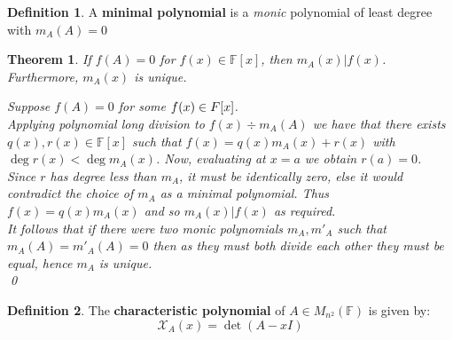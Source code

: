 \documentclass[11pt, a4paper]{report}
\makeatletter
\numberwithin{equation}{section}
\renewcommand{\chi}{\mathcal{X}}
\newcommand{\F}{\mathbb{F}}
\numberwithin{equation}{subsection}
\theoremstyle{plain}
\newtheorem{thm}{Theorem}[chapter] %
\theoremstyle{definition}
\newtheorem{defn}{Definition}[chapter]
\theoremstyle{remark}
\newtheorem*{prf}{Proof}
\renewenvironment{prf}[1][\proofname]{\par
  \vspace{-\topsep}%
  \normalfont
  \topsep0pt \partopsep0pt %
  \trivlist
  \item[\hskip\labelsep
        \itshape
    #1\@addpunct{.}]\ignorespaces
}{%
  \popQED\endtrivlist\@endpefalse
  \addvspace{6pt plus 6pt} %
}
\newcommand{\pr}[1]{\begin{adjustwidth}{1cm}{} \begin{prf} #1 \end{prf} \end{adjustwidth}}
\makeatother
\begin{document}
\newpage
\begin{defn} A \textbf{minimal polynomial} is a \textit{monic} polynomial of least degree with $m_A(A) = 0$ \end{defn}

\begin{thm}
If $f(A) = 0$ for $f(x) \in \F[x]$, then $m_A(x) | f(x)$. Furthermore, $m_A(x)$ is unique.
\pr{
Suppose $f(A) = 0$ for some $f(x) \in \\F[x]$.\\ Applying polynomial long division to $f(x) \div m_A(A)$ we have that there exists $q(x), r(x) \in \F[x]$ such that $f(x) = q(x)m_A(x) + r(x)$ with $\deg r(x) < \deg m_A(x)$. Now, evaluating at $x = a$ we obtain $r(a) = 0$. Since $r$ has degree less than $m_A$, it must be identically zero, else it would contradict the choice of $m_A$ as a minimal polynomial. Thus $f(x) = q(x)m_A(x)$ and so $m_A(x) | f(x)$ as required.\\
It follows that if there were two monic polynomials $m_A, m'_A$ such that $m_A(A) = m'_A(A) = 0$ then as they must both divide each other they must be equal, hence $m_A$ is unique.\\[-8pt]\qed
}
\end{thm}

\begin{defn} The \textbf{characteristic polynomial} of $A \in M_{n^2}(\F)$ is given by:
$$\chi_A(x) = \det(A - xI)$$
\end{defn}
\end{document}
